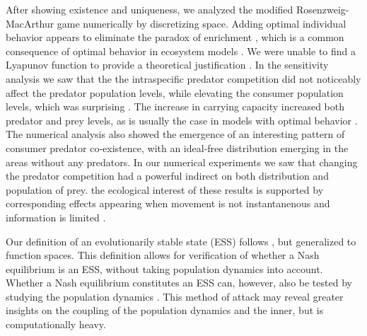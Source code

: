 After showing existence and uniqueness, we analyzed the modified Rosenzweig-MacArthur game numerically by discretizing space. Adding optimal individual behavior appears to eliminate the paradox of enrichment \citep{rosenzweig1971paradox}, which is a common consequence of optimal behavior in ecosystem models \citep{abrams2010implications}. We were unable to find a Lyapunov function to provide a theoretical justification \citep{kvrivan2009evolutionary}. In the sensitivity analysis we saw that the the intraspecific predator competition did not noticeably affect the predator population levels, while elevating the consumer population levels, which was surprising \citep{abrams2010implications}. The increase in carrying capacity increased both predator and prey levels, as is usually the case in models with optimal behavior \citep{valdovinos2010consequences}. The numerical analysis also showed the emergence of an interesting pattern of consumer predator co-existence, with an ideal-free distribution emerging in the areas without any predators. In our numerical experiments we saw that changing the predator competition had a powerful indirect on both distribution and population of prey. the ecological interest of these results is supported by corresponding effects appearing when movement is not instantanenous and information is limited \citep{flaxman2011evolutionary}.



Our definition of an evolutionarily stable state (ESS) follows \citep{cressman2001evolutionary}, but generalized to function spaces. This definition allows for verification of whether a Nash equilibrium is an ESS, without taking population dynamics into account. Whether a Nash equilibrium constitutes an ESS can, however, also be tested by studying the population dynamics \citep{grunert2021evolutionarily}. This method of attack may reveal greater insights on the coupling of the population dynamics and the inner, but is computationally heavy.


